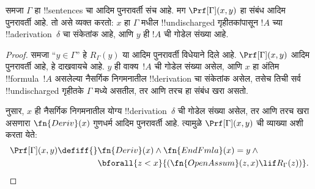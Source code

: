 \documentclass[../../../include/open-logic-section]{subfiles}
\begin{document}
\begin{prop}
  समजा $\Gamma$ हा !!{sentence}s चा आदिम पुनरावर्ती संच आहे.
  मग $\Prf[\Gamma](x, y)$ हा संबंध आदिम पुनरावर्ती आहे. तो असे व्यक्त
  करतो: $x$ हा $\Gamma$ मधील !!{undischarged} गृहीतकांपासून
  $!A$ च्या !!a{derivation}~$\delta$ चा संकेतांक आहे, आणि
  $y$ ही $!A$ ची गोडेल संख्या आहे.
\end{prop}

\begin{proof}
  समजा ``$y \in \Gamma$'' हे $R_\Gamma(y)$ या आदिम पुनरावर्ती
  विधेयाने दिले आहे. $\Prf[\Gamma](x, y)$ आदिम पुनरावर्ती आहे,
  हे दाखवायचे आहे. $y$ ही वाक्य~$!A$ ची गोडेल संख्या असेल,
  आणि $x$ हा अंतिम !!{formula}~$!A$ असलेल्या नैसर्गिक निगमनातील
  !!{derivation} चा संकेतांक असेल, तसेच तिची सर्व
  !!{undischarged} गृहीतके $\Gamma$ मध्ये असतील, तर आणि तरच हा
  संबंध खरा असतो.

   नुसार, $x$ ही नैसर्गिक निगमनातील योग्य
  !!{derivation}~$\delta$ ची गोडेल संख्या असेल, तर आणि तरच खरा
  असणारा $\fn{Deriv}(x)$ गुणधर्म आदिम पुनरावर्ती आहे. त्यामुळे
  $\Prf[\Gamma](x, y)$ ची व्याख्या अशी करता येते:
  \begin{align*}
    \Prf[\Gamma](x, y) \defiff {}
    & \fn{Deriv}(x) \land \fn{EndFmla}(x) = y \land {} \\
    & \bforall{z < x}{(\fn{OpenAssum}(z, x) \lif R_\Gamma(z))}.
  \end{align*}
\end{proof}
\end{document}
